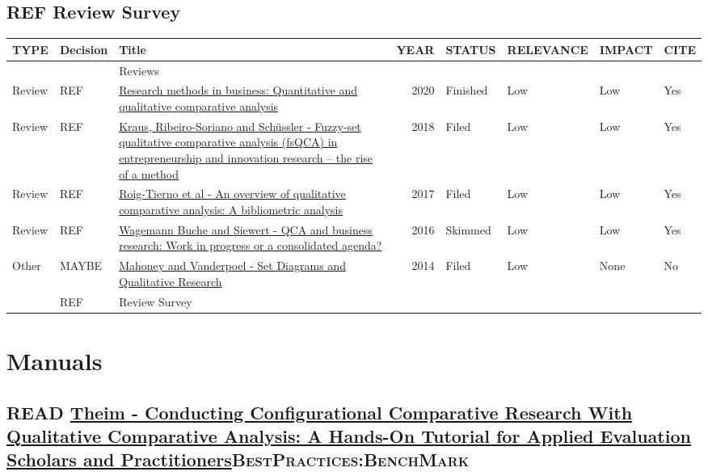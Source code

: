 \documentclass[11pt]{article}
\begin{document}
\subsection*{{\bfseries\sffamily REF} Review Survey}
\label{sec:org7834b27}
\begin{center}
\begin{tabular}{lllrllll}
TYPE & Decision & Title & YEAR & STATUS & RELEVANCE & IMPACT & CITE\\
\hline
 &  & Reviews &  &  &  &  & \\
Review & REF & \href{https://doi.org/10.1016/j.jbusres.2020.05.003}{Research methods in business: Quantitative and qualitative comparative analysis} & 2020 & Finished & Low & Low & Yes\\
Review & REF & \href{https://doi.org/10.1007/s11365-017-0461-8}{Kraus, Ribeiro-Soriano and Schüssler -  Fuzzy-set qualitative comparative analysis (fsQCA) in entrepreneurship and innovation research – the rise of a method} & 2018 & Filed & Low & Low & Yes\\
Review & REF & \href{https://doi.org/10.1016/j.jik.2016.12.002}{Roig-Tierno et al - An overview of qualitative comparative analysis: A bibliometric analysis} & 2017 & Filed & Low & Low & Yes\\
Review & REF & \href{https://doi.org/10.1016/j.jbusres.2015.10.010}{Wagemann Buche and Siewert - QCA and business research: Work in progress or a consolidated agenda?} & 2016 & Skimmed & Low & Low & Yes\\
Other & MAYBE & \href{https://doi.org/10.1177\%2F0010414013519410}{Mahoney and Vanderpoel - Set Diagrams and Qualitative Research} & 2014 & Filed & Low & None & No\\
 & REF & Review Survey &  &  &  &  & \\
\end{tabular}
\end{center}

\section*{Manuals}
\label{sec:orgd685ca4}
\subsection*{{\bfseries\sffamily READ} \href{https://doi.org/10.1177\%2F1098214016673902}{Theim - Conducting Configurational Comparative Research With Qualitative Comparative Analysis: A Hands-On Tutorial for Applied Evaluation Scholars and Practitioners}\hfill{}\textsc{BestPractices:BenchMark}}
\label{sec:org4dc8b3a}
\end{document}
